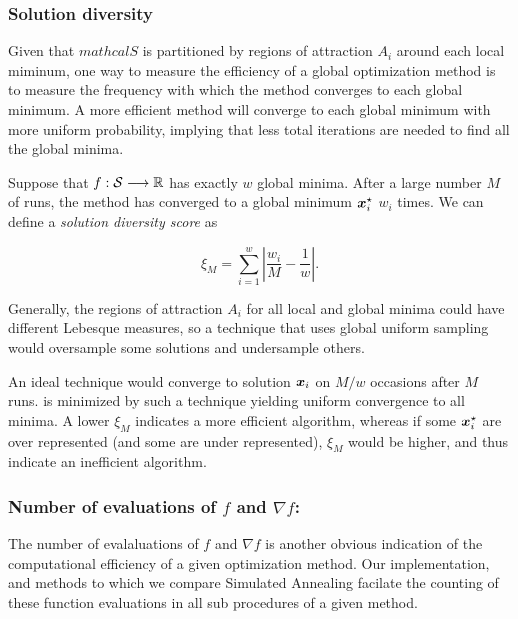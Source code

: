 \subsubsection{Solution diversity}

Given that $mathcal{S}$ is partitioned by regions of attraction $A_i$ around each local miminum, one way to measure the
efficiency of a global optimization method is to measure the frequency with which the method converges to each global
minimum. A more efficient method will converge to each global minimum with more uniform probability, implying that
less total iterations are needed to find all the global minima.

Suppose that $f :\mathcal{S}\longrightarrow \mathbb{R}$ has exactly $w$ global minima. After a large number $M$ of runs,
the method has converged to a global minimum $\boldsymbol{x}^\star_i$ $w_i$ times. We can define a \emph{solution diversity score} as

\begin{equation}\label{eq:diversity}
    \xi_M = \sum_{i=1}^w \left| \frac{w_i}{M} - \frac{1}{w}\right|.
\end{equation}

Generally, the regions of attraction $A_i$ for all local and global minima could have different Lebesque measures, so a technique
that uses global uniform sampling would oversample some solutions and undersample others.

An ideal technique would converge to solution $\boldsymbol{x}_i$ on $M/w$ occasions after $M$ runs.  is
minimized by such a technique yielding uniform convergence to all minima. A lower $\xi_M$ indicates a more efficient algorithm,
whereas if some $\boldsymbol{x}_i^\star$ are over represented (and some are under represented), $\xi_M$ would be higher, and thus
indicate an inefficient algorithm.

\subsubsection{Number of evaluations of $f$ and $\nabla f$:}

The number of evalaluations of $f$ and $\nabla f$ is another obvious indication of the computational efficiency of a given
optimization method. Our implementation, and methods to which we compare Simulated Annealing facilate the counting of
these function evaluations in all sub procedures of a given method.

